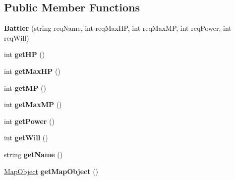 \subsection*{Public Member Functions}
\begin{DoxyCompactItemize}
\item 
\hypertarget{class_simple_r_p_g_1_1_battler_a2d569c96856b4016469898c763cd80cd}{{\bfseries Battler} (string req\-Name, int req\-Max\-H\-P, int req\-Max\-M\-P, int req\-Power, int req\-Will)}\label{class_simple_r_p_g_1_1_battler_a2d569c96856b4016469898c763cd80cd}

\item 
\hypertarget{class_simple_r_p_g_1_1_battler_a33717e4b3db920bc7b1e91cd5923d440}{int {\bfseries get\-H\-P} ()}\label{class_simple_r_p_g_1_1_battler_a33717e4b3db920bc7b1e91cd5923d440}

\item 
\hypertarget{class_simple_r_p_g_1_1_battler_a4cfa0cad3cbcd37a0b778371f1bca4ac}{int {\bfseries get\-Max\-H\-P} ()}\label{class_simple_r_p_g_1_1_battler_a4cfa0cad3cbcd37a0b778371f1bca4ac}

\item 
\hypertarget{class_simple_r_p_g_1_1_battler_a545f4fc14281ea68bcbc096d74283027}{int {\bfseries get\-M\-P} ()}\label{class_simple_r_p_g_1_1_battler_a545f4fc14281ea68bcbc096d74283027}

\item 
\hypertarget{class_simple_r_p_g_1_1_battler_ac5abba3a65530d57317ffb745904ece5}{int {\bfseries get\-Max\-M\-P} ()}\label{class_simple_r_p_g_1_1_battler_ac5abba3a65530d57317ffb745904ece5}

\item 
\hypertarget{class_simple_r_p_g_1_1_battler_a26be8c08a8909d19e617ef6bc9d0751a}{int {\bfseries get\-Power} ()}\label{class_simple_r_p_g_1_1_battler_a26be8c08a8909d19e617ef6bc9d0751a}

\item 
\hypertarget{class_simple_r_p_g_1_1_battler_ab7539435d53520b9aaee35958e14472f}{int {\bfseries get\-Will} ()}\label{class_simple_r_p_g_1_1_battler_ab7539435d53520b9aaee35958e14472f}

\item 
\hypertarget{class_simple_r_p_g_1_1_battler_ad74e17513ba2f88b2bc6830ce9259e3b}{string {\bfseries get\-Name} ()}\label{class_simple_r_p_g_1_1_battler_ad74e17513ba2f88b2bc6830ce9259e3b}

\item 
\hypertarget{class_simple_r_p_g_1_1_battler_ae33a4b8a4af396dc2dfd26ad4938dcfa}{\hyperlink{class_simple_r_p_g_1_1_map_object}{Map\-Object} {\bfseries get\-Map\-Object} ()}\label{class_simple_r_p_g_1_1_battler_ae33a4b8a4af396dc2dfd26ad4938dcfa}


\end{DoxyCompactItemize}
